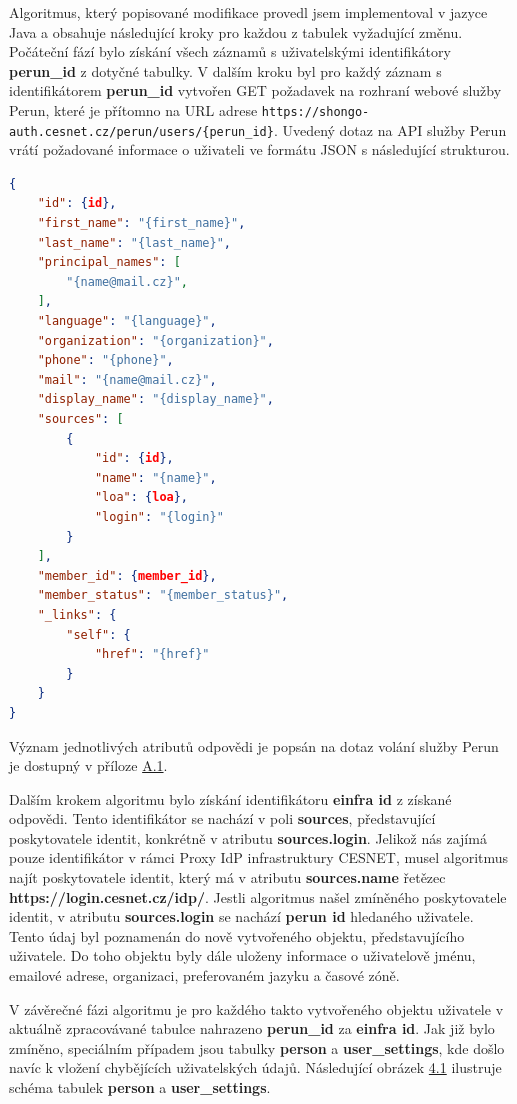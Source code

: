 \documentclass[
  printed, %
  twoside, %
  table,   %
  nolof,     %
  nolot,     %
]{fithesis3}
\begin{document}
Algoritmus, který popisované modifikace provedl jsem implementoval v jazyce Java a obsahuje následující kroky pro každou z tabulek vyžadující změnu. Počáteční fází bylo získání všech záznamů s uživatelskými identifikátory \textbf{perun\_id} z dotyčné tabulky. V dalším kroku byl pro každý záznam s identifikátorem \textbf{perun\_id} vytvořen GET požadavek na rozhraní webové služby Perun, které je přítomno na URL adrese \texttt{https://shongo-auth.cesnet.cz/perun/users/\{perun\_id\}}. Uvedený dotaz na API služby Perun vrátí požadované informace o uživateli ve formátu JSON s následující strukturou.
\begin{lstlisting}[language=json,firstnumber=1]
{
    "id": {id},
    "first_name": "{first_name}",
    "last_name": "{last_name}",
    "principal_names": [
        "{name@mail.cz}",
    ],
    "language": "{language}",
    "organization": "{organization}",
    "phone": "{phone}",
    "mail": "{name@mail.cz}",
    "display_name": "{display_name}",
    "sources": [
        {
            "id": {id},
            "name": "{name}",
            "loa": {loa},
            "login": "{login}"
        }
    ],
    "member_id": {member_id},
    "member_status": "{member_status}",
    "_links": {
        "self": {
            "href": "{href}"
        }
    }
}
\end{lstlisting}

Význam jednotlivých atributů odpovědi je popsán na dotaz volání služby Perun je dostupný v příloze \hyperref[table:perunws:user]{A.1}. 
\par
Dalším krokem algoritmu bylo získání identifikátoru \textbf{einfra id} z získané odpovědi. Tento identifikátor se nachází v poli \textbf{sources}, představující poskytovatele identit, konkrétně v atributu \textbf{sources.login}. Jelikož nás zajímá pouze identifikátor v rámci Proxy IdP infrastruktury CESNET, musel algoritmus najít poskytovatele identit, který má v atributu \textbf{sources.name} řetězec \textbf{https://login.cesnet.cz/idp/}. Jestli algoritmus našel zmíněného poskytovatele identit, v atributu \textbf{sources.login} se nachází \textbf{perun id} hledaného uživatele. Tento údaj byl poznamenán do nově vytvořeného objektu, představujícího uživatele. Do toho objektu byly dále uloženy informace o uživatelově jménu, emailové adrese, organizaci, preferovaném jazyku a časové zóně. 

\par

V závěrečné fázi algoritmu je pro každého takto vytvořeného objektu uživatele v aktuálně zpracovávané tabulce nahrazeno \textbf{perun\_id} za \textbf{einfra id}. Jak již bylo zmíněno, speciálním případem jsou tabulky \textbf{person} a \textbf{user\_settings}, kde došlo navíc k vložení chybějících uživatelských údajů. Následující obrázek \hyperref[fig:erd-person-user-settings]{4.1} ilustruje schéma tabulek \textbf{person} a \textbf{user\_settings}. 
\end{document}
